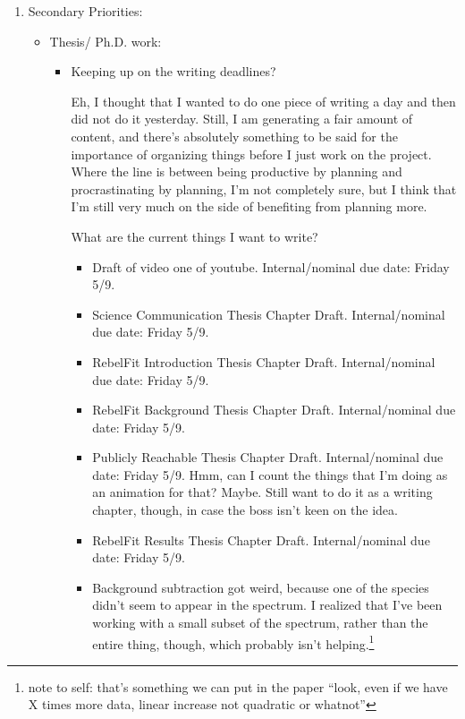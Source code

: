 \documentclass[12pt]{article}
\newcommand{\say}[1]{``#1''}
\renewcommand{\,}{\textsuperscript{,}}
\begin{document}
\begin{enumerate}
\begin{itemize}
\begin{itemize}
\end{itemize}

\end{itemize}

\item Secondary Priorities:

\begin{itemize}

\item Thesis/ Ph.D. work:

\begin{itemize}

\item Keeping up on the writing deadlines?

Eh, I thought that I wanted to do one piece of writing a day and then did not do it yesterday.  
Still, I am generating a fair amount of content, and there's absolutely something to be said for the importance of organizing things before I just work on the project.  
Where the line is between being productive by planning and procrastinating by planning, I'm not completely sure, but I think that I'm still very much on the side of benefiting from planning more.

What are the current things I want to write?

\begin{itemize}

\item Draft of video one of youtube. Internal/nominal due date: Friday 5/9.

\item Science Communication Thesis Chapter Draft. Internal/nominal due date: Friday 5/9.

\item RebelFit Introduction Thesis Chapter Draft. Internal/nominal due date: Friday 5/9.

\item RebelFit Background Thesis Chapter Draft. Internal/nominal due date: Friday 5/9.

\item Publicly Reachable Thesis Chapter Draft. Internal/nominal due date: Friday 5/9. Hmm, can I count the things that I'm doing as an animation for that?  
Maybe.  
Still want to do it as a writing chapter, though, in case the boss isn't keen on the idea.

\item RebelFit Results Thesis Chapter Draft. Internal/nominal due date: Friday 5/9.

\item Background subtraction got weird, because one of the species didn't seem to appear in the spectrum. I realized that I've been working with a small subset of the spectrum, rather than the entire thing, though, which probably isn't helping.\footnote{note to self: that's something we can put in the paper \say{look, even if we have X times more data, linear increase not quadratic or whatnot}}


\end{itemize}
\end{itemize}
\end{itemize}
\end{enumerate}
\end{document}
